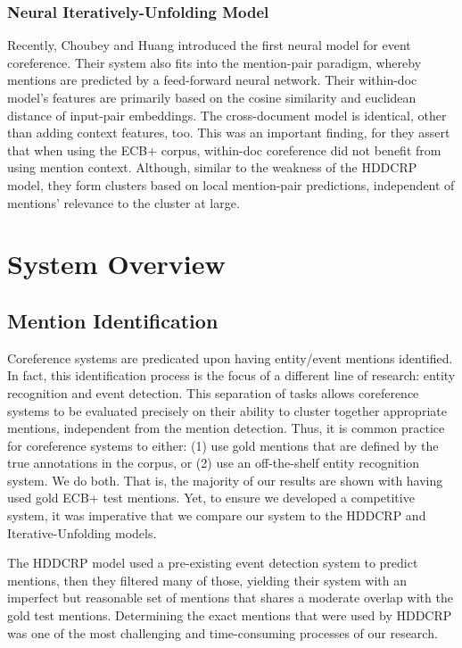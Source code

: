 \documentclass[11pt,a4paper]{article}
\begin{document}
\subsubsection{Neural Iteratively-Unfolding Model}
\label{sec:Choubey}
Recently, Choubey and Huang  introduced the first neural model for event coreference.  Their system also fits into the mention-pair paradigm, whereby mentions are predicted by a feed-forward neural network. Their within-doc model's features are primarily based on the cosine similarity and euclidean distance of input-pair embeddings.  The cross-document model is identical, other than adding context features, too.  This was an important finding, for they assert that when using the ECB+ corpus, within-doc coreference did not benefit from using mention context.  Although, similar to the weakness of the HDDCRP model, they form clusters based on local mention-pair predictions, independent of mentions' relevance to the cluster at large.

\section{System Overview}
\subsection{Mention Identification}
\label{sec:mentionid}
Coreference systems are predicated upon having entity/event mentions identified.  In fact, this identification process is the focus of a different line of research: entity recognition and event detection.  This separation of tasks allows coreference systems to be evaluated precisely on their ability to cluster together appropriate mentions, independent from the mention detection.  Thus, it is common practice for coreference systems to either: (1) use gold mentions that are defined by the true annotations in the corpus, or (2) use an off-the-shelf entity recognition system.  We do both.  That is, the majority of our results are shown with having used gold ECB+ test mentions.  Yet, to ensure we developed a competitive system, it was imperative that we compare our system to the HDDCRP and Iterative-Unfolding models.

The HDDCRP model used a pre-existing event detection system to predict mentions, then they filtered many of those, yielding their system with an imperfect but reasonable set of mentions that shares a moderate overlap with the gold test mentions.  Determining the exact mentions that were used by HDDCRP was one of the most challenging and time-consuming processes of our research.
\end{document}
